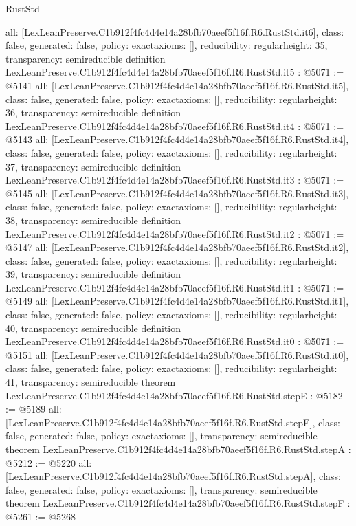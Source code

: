 \begin{lexlean}{RustStd}
\begin{coremodule}
{  all: [LexLeanPreserve.C1b912f4fc4d4e14a28bfb70aeef5f16f.R6.RustStd.it6],
  class: false,
  generated: false,
  policy: exact{axioms: []},
  reducibility: regular{height: 35},
  transparency: semireducible
}
definition LexLeanPreserve.C1b912f4fc4d4e14a28bfb70aeef5f16f.R6.RustStd.it5 : @5071 := @5141 {
  all: [LexLeanPreserve.C1b912f4fc4d4e14a28bfb70aeef5f16f.R6.RustStd.it5],
  class: false,
  generated: false,
  policy: exact{axioms: []},
  reducibility: regular{height: 36},
  transparency: semireducible
}
definition LexLeanPreserve.C1b912f4fc4d4e14a28bfb70aeef5f16f.R6.RustStd.it4 : @5071 := @5143 {
  all: [LexLeanPreserve.C1b912f4fc4d4e14a28bfb70aeef5f16f.R6.RustStd.it4],
  class: false,
  generated: false,
  policy: exact{axioms: []},
  reducibility: regular{height: 37},
  transparency: semireducible
}
definition LexLeanPreserve.C1b912f4fc4d4e14a28bfb70aeef5f16f.R6.RustStd.it3 : @5071 := @5145 {
  all: [LexLeanPreserve.C1b912f4fc4d4e14a28bfb70aeef5f16f.R6.RustStd.it3],
  class: false,
  generated: false,
  policy: exact{axioms: []},
  reducibility: regular{height: 38},
  transparency: semireducible
}
definition LexLeanPreserve.C1b912f4fc4d4e14a28bfb70aeef5f16f.R6.RustStd.it2 : @5071 := @5147 {
  all: [LexLeanPreserve.C1b912f4fc4d4e14a28bfb70aeef5f16f.R6.RustStd.it2],
  class: false,
  generated: false,
  policy: exact{axioms: []},
  reducibility: regular{height: 39},
  transparency: semireducible
}
definition LexLeanPreserve.C1b912f4fc4d4e14a28bfb70aeef5f16f.R6.RustStd.it1 : @5071 := @5149 {
  all: [LexLeanPreserve.C1b912f4fc4d4e14a28bfb70aeef5f16f.R6.RustStd.it1],
  class: false,
  generated: false,
  policy: exact{axioms: []},
  reducibility: regular{height: 40},
  transparency: semireducible
}
definition LexLeanPreserve.C1b912f4fc4d4e14a28bfb70aeef5f16f.R6.RustStd.it0 : @5071 := @5151 {
  all: [LexLeanPreserve.C1b912f4fc4d4e14a28bfb70aeef5f16f.R6.RustStd.it0],
  class: false,
  generated: false,
  policy: exact{axioms: []},
  reducibility: regular{height: 41},
  transparency: semireducible
}
theorem LexLeanPreserve.C1b912f4fc4d4e14a28bfb70aeef5f16f.R6.RustStd.stepE : @5182 := @5189 {
  all: [LexLeanPreserve.C1b912f4fc4d4e14a28bfb70aeef5f16f.R6.RustStd.stepE],
  class: false,
  generated: false,
  policy: exact{axioms: []},
  transparency: semireducible
}
theorem LexLeanPreserve.C1b912f4fc4d4e14a28bfb70aeef5f16f.R6.RustStd.stepA : @5212 := @5220 {
  all: [LexLeanPreserve.C1b912f4fc4d4e14a28bfb70aeef5f16f.R6.RustStd.stepA],
  class: false,
  generated: false,
  policy: exact{axioms: []},
  transparency: semireducible
}
theorem LexLeanPreserve.C1b912f4fc4d4e14a28bfb70aeef5f16f.R6.RustStd.stepF : @5261 := @5268 {
}
\end{coremodule}
\end{lexlean}
